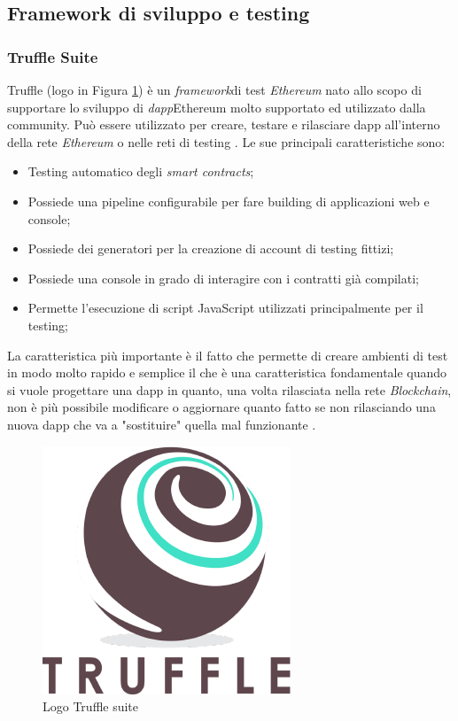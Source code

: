 \subsection{Framework di sviluppo e testing}
\subsubsection{Truffle Suite}
Truffle (logo in Figura \ref{img:truffle}) è un \emph{\gls{framework}}\glsfirstoccur  di test \textit{Ethereum} nato allo scopo di supportare lo sviluppo di \emph{\gls{dapp}}\glsfirstoccur  Ethereum molto supportato ed utilizzato dalla community.
Può essere utilizzato per creare, testare e rilasciare \gls{dapp} all'interno della rete \textit{Ethereum} o nelle reti di testing \cite{truffle}.
Le sue principali caratteristiche sono:
\begin{itemize}
	\item Testing automatico degli \textit{smart contracts};
	\item Possiede una pipeline configurabile per fare building di applicazioni web e console;
	\item Possiede dei generatori per la creazione di account di testing fittizi;
	\item Possiede una console in grado di interagire con i contratti già compilati;
	\item Permette l'esecuzione di script JavaScript utilizzati principalmente per il testing;
\end{itemize}
La caratteristica più importante è il fatto che permette di creare ambienti di test in modo molto rapido e semplice il che è una caratteristica fondamentale quando si vuole progettare una \gls{dapp} in quanto, una volta rilasciata nella rete \textit{Blockchain}, non è più possibile modificare o aggiornare quanto fatto se non rilasciando una nuova \gls{dapp} che va a "sostituire" quella mal funzionante \cite{truffle}.
\begin{figure}[h]
	\centering
	\includegraphics[scale=0.3]{immagini/truffle}
	\caption{Logo Truffle suite}
	\label{img:truffle}
\end{figure}
